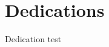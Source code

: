 \section*{Dedications}
\vspace*{20mm}
\begin{center}
\begin{minipage}{0.8\textwidth}
Dedication test
\end{minipage}
\end{center}
\newpage

